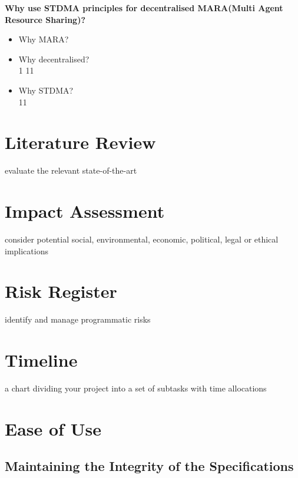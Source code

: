 \documentclass[conference]{IEEEtran}
\begin{document}


\textbf{Why use STDMA principles for decentralised MARA(Multi Agent Resource Sharing)?}
\begin{itemize}
    \item Why MARA?\\

    \item Why decentralised?\\
    1
    11
    \item Why STDMA?\\
    11
\end{itemize}

\section{Literature Review}
evaluate the relevant state-of-the-art


\section{Impact Assessment}
consider potential social, environmental, economic, political, legal or ethical implications

\section{Risk Register}
identify and manage programmatic risks

\section{Timeline}
a chart dividing your project into a set of subtasks with time allocations

\section{Ease of Use}

\subsection{Maintaining the Integrity of the Specifications}
\end{document}
